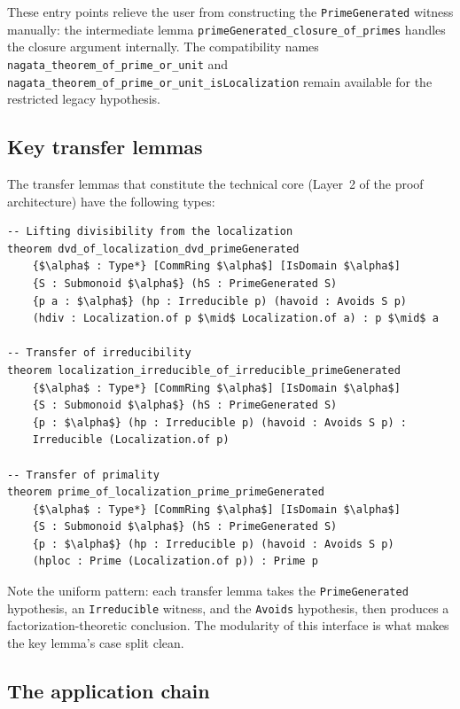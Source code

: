 \documentclass[11pt]{article}
\theoremstyle{plain}
\theoremstyle{definition}
\theoremstyle{remark}
\newcommand{\li}[1]{\texorpdfstring{\texttt{#1}}{#1}}
\begin{document}
\noindent
These entry points relieve the user from constructing the
\li{PrimeGenerated} witness manually: the intermediate lemma
\li{primeGenerated\_closure\_of\_primes} handles the closure argument
internally.  The compatibility names
\li{nagata\_theorem\_of\_prime\_or\_unit} and
\li{nagata\_theorem\_of\_prime\_or\_unit\_isLocalization} remain available for
the restricted legacy hypothesis.

\subsection{Key transfer lemmas}

The transfer lemmas that constitute the technical core (Layer~2 of the proof
architecture) have the following types:

\begin{lstlisting}[style=lean]
-- Lifting divisibility from the localization
theorem dvd_of_localization_dvd_primeGenerated
    {$\alpha$ : Type*} [CommRing $\alpha$] [IsDomain $\alpha$]
    {S : Submonoid $\alpha$} (hS : PrimeGenerated S)
    {p a : $\alpha$} (hp : Irreducible p) (havoid : Avoids S p)
    (hdiv : Localization.of p $\mid$ Localization.of a) : p $\mid$ a

-- Transfer of irreducibility
theorem localization_irreducible_of_irreducible_primeGenerated
    {$\alpha$ : Type*} [CommRing $\alpha$] [IsDomain $\alpha$]
    {S : Submonoid $\alpha$} (hS : PrimeGenerated S)
    {p : $\alpha$} (hp : Irreducible p) (havoid : Avoids S p) :
    Irreducible (Localization.of p)

-- Transfer of primality
theorem prime_of_localization_prime_primeGenerated
    {$\alpha$ : Type*} [CommRing $\alpha$] [IsDomain $\alpha$]
    {S : Submonoid $\alpha$} (hS : PrimeGenerated S)
    {p : $\alpha$} (hp : Irreducible p) (havoid : Avoids S p)
    (hploc : Prime (Localization.of p)) : Prime p
\end{lstlisting}

\noindent
Note the uniform pattern: each transfer lemma takes the \li{PrimeGenerated}
hypothesis, an \li{Irreducible} witness, and the \li{Avoids} hypothesis, then
produces a factorization-theoretic conclusion.  The modularity of this
interface is what makes the key lemma's case split clean.

\subsection{The application chain}
\end{document}
